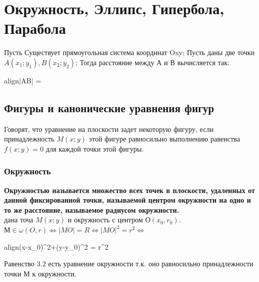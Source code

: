 \documentclass[oneside]{book}
\newcommand{\boxedeq}[2]{\begin{empheq}[box={\fboxsep=6pt\fbox}]{align}\label{#1}#2\end{empheq}}
\begin{document}
\chapter[Плоские фигуры]{Окружность, Эллипс, Гипербола, Парабола}
Пусть Существует прямоугольная система координат Oxy; Пусть даны две точки $A(x_1; y_1), B(x_2; y_2)$;
Тогда расстояние между А и В вычисляется так: \boxedeq{eq:*}{|AB| = }

\section[Уравнения фигур]{Фигуры и канонические уравнения фигур}
Говорят, что уравнение на плоскости задет некоторую фигуру, если принадлежность $M(x; y)$ этой фигуре равносильно
выполнению равенства $f(x; y) = 0$ для каждой точки этой фигуры.

\subsection{Окружность}
\textbf{Окружностью называется множество всех точек в плоскости, удаленных от данной фиксированной точки, называемой
центром окружности на одно и то же расстояние, называемое радиусом окружности.} \\
дана точа $M(x; y)$ и окружность с центром О$(x_0, r_0)$. $М \in \omega(O, r) \Leftrightarrow |MO|=R \Leftrightarrow
|MO|^2 = r^2 \Leftrightarrow$ \boxedeq{eq:*}{(x-x_0)^2+(y-y_0)^2 = r^2}
Равенство 3.2 есть уравнение окружности т.к. оно равносильно принадлежности точки М к окружности.
\end{document}
